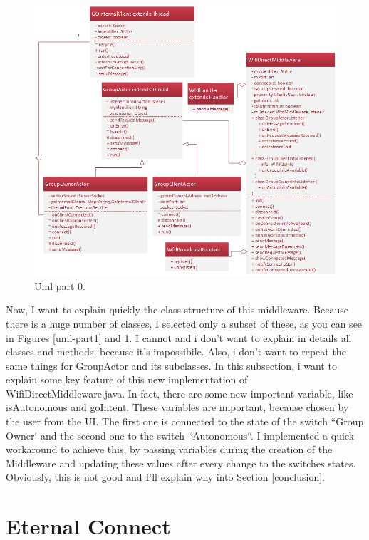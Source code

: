 \begin{figure}[thpb]
	\centering
	\includegraphics[scale=0.6]{./images/chap2/uml-parte2.png}
	\caption{Uml part 0.}
	\label{uml-part2}
\end{figure}	


Now, I want to explain quickly the class structure of this middleware. Because there is a huge number of classes, I selected only a subset of these, as you can see in Figures \ref{uml-part1} and \ref{uml-part2}.
I cannot and i don't want to explain in details all classes and methods, because it's impossibile. Also, i don't want to repeat the same things for GroupActor and its subclasses.
In this subsection, i want to explain some key feature of this new implementation of WifiDirectMiddleware.java.
In fact, there are some new important variable, like isAutonomous and goIntent. These variables are important, because chosen by the user from the UI. The first one is connected to the state of the switch ``Group Owner` and the second one to the switch ``Autonomous``. 
I implemented a quick workaround to achieve this, by passing variables during the creation of the Middleware and updating these values after every change to the switches states. Obviously, this is not good and I'll explain why into Section \ref{conclusion}.


\section{Eternal Connect}

